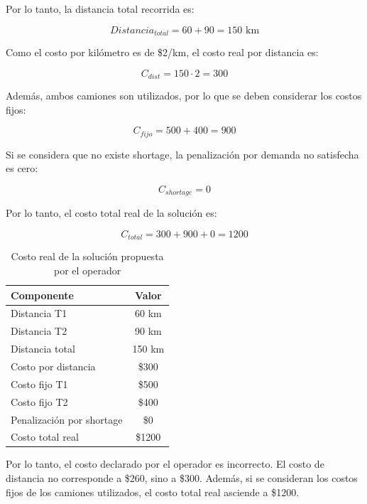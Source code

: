 Por lo tanto, la distancia total recorrida es:

\begin{equation*}
Distancia_{total} = 60 + 90 = 150 \text{ km}
\end{equation*}

Como el costo por kilómetro es de \$2/km, el costo real por distancia es:

\begin{equation*}
C_{dist} = 150 \cdot 2 = 300
\end{equation*}

Además, ambos camiones son utilizados, por lo que se deben considerar los costos fijos:

\begin{equation*}
C_{fijo} = 500 + 400 = 900
\end{equation*}

Si se considera que no existe shortage, la penalización por demanda no satisfecha es cero:

\begin{equation*}
C_{shortage} = 0
\end{equation*}

Por lo tanto, el costo total real de la solución es:

\begin{equation*}
C_{total} = 300 + 900 + 0 = 1200
\end{equation*}

\begin{table}[H]
\centering
\caption{Costo real de la solución propuesta por el operador}
\begin{tabular}{lc}
\toprule
Componente & Valor \\
\midrule
Distancia T1 & 60 km \\
Distancia T2 & 90 km \\
Distancia total & 150 km \\
Costo por distancia & \$300 \\
Costo fijo T1 & \$500 \\
Costo fijo T2 & \$400 \\
Penalización por shortage & \$0 \\
\midrule
Costo total real & \$1200 \\
\bottomrule
\end{tabular}
\end{table}

Por lo tanto, el costo declarado por el operador es incorrecto. El costo de distancia no corresponde a \$260, sino a \$300. Además, si se consideran los costos fijos de los camiones utilizados, el costo total real asciende a \$1200.

